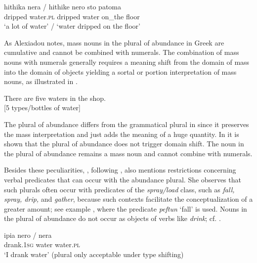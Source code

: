 \documentclass[output=paper,colorlinks,citecolor=brown]{langscibook}
\begin{document}
\ea\label{ex:geist:34}
\gll hithika nera / hithike nero sto patoma \\	
dripped water.\textsc{pl} {} dripped water on\_the floor \\
\glt `a lot of water' / `water dripped on the floor' \hfill \citep[Greek;][36]{Alexiadou2011}
\z

\noindent As Alexiadou notes, mass nouns in the plural of abundance in Greek are cumulative and cannot be combined with numerals. The combination of mass nouns with numerals generally requires a meaning shift from the domain of mass into the domain of objects yielding a sortal or portion interpretation of mass nouns, as illustrated in .

\ea\label{ex:geist:35}
There are five waters in the shop.\\ 
{[}5 types/bottles of water]
\z

\noindent The plural of abundance differs from the grammatical plural in  since it preserves the mass interpretation and just adds the meaning of a huge quantity. In  it is shown that the plural of abundance does not trigger domain shift. The noun in the plural of abundance remains a mass noun and cannot combine with numerals.

\label{ex:geist:36}
\z

\noindent Besides these peculiarities, \citet{Alexiadou2019}, following \citet{Acquaviva2004}, also mentions restrictions concerning verbal predicates that can occur with the abundance plural. She observes that such plurals often occur with predicates of the \textit{spray/load} class, such as \textit{fall, spray, drip,} and \textit{gather}, because such contexts facilitate the conceptualization of a greater amount; see example , where the predicate \textit{peftun} `fall' is used. Nouns in the plural of abundance do not occur as objects of verbs like \textit{drink}; cf. .

\ea\label{ex:geist:37}
\gll ipia nero / \minsp{\#} nera \\ 
drank.\textsc{1sg} water {} {} water.\textsc{pl} \\ %
\glt `I drank water' (plural only acceptable under type shifting) \\ \hfill \citep[Greek;][36]{Alexiadou2011} 
\z
\end{document}
